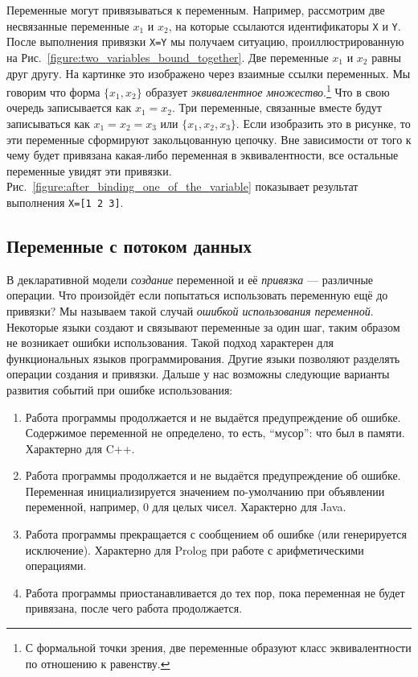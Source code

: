 Переменные могут привязываться к переменным. Например, рассмотрим две несвязанные переменные $x_{1}$ и $x_{2}$, на которые ссылаются идентификаторы \lstinline|X| и \lstinline|Y|. После выполнения привязки \lstinline|X=Y| мы получаем ситуацию, проиллюстрированную на Рис.~\ref{figure:two_variables_bound_together}. Две переменные $x_{1}$ и $x_{2}$ равны друг другу. На картинке это изображено через взаимные ссылки переменных. Мы говорим что форма $\{x_{1}, x_{2}\}$ образует \emph{эквивалентное множество}.\footnote{С формальной точки зрения, две переменные образуют класс эквивалентности по отношению к равенству.} Что в свою очередь записывается как $x_{1}=x_{2}$. Три переменные, связанные вместе будут записываться как $x_{1}=x_{2}=x_{3}$ или $\{x_{1}, x_{2}, x_{3}\}$. Если изобразить это в рисунке, то эти переменные сформируют закольцованную цепочку. Вне зависимости от того к чему будет привязана какая-либо переменная в эквивалентности, все остальные переменные увидят эти привязки. Рис.~\ref{figure:after_binding_one_of_the_variable} показывает результат выполнения \lstinline|X=[1 2 3]|.

\subsection{Переменные с потоком данных}\label{subsection:dataflow_variables}

В декларативной модели \emph{создание} переменной и её \emph{привязка} --- различные операции. Что произойдёт если попытаться использовать переменную ещё до привязки? Мы называем такой случай \emph{ошибкой использования переменной}. Некоторые языки создают и связывают переменные за один шаг, таким образом не возникает ошибки использования. Такой подход характерен для функциональных языков программирования. Другие языки позволяют разделять операции создания и привязки. Дальше у нас возможны следующие варианты развития событий при ошибке использования:

\begin{enumerate}
  
\item{Работа программы продолжается и не выдаётся предупреждение об ошибке. Содержимое переменной не определено, то есть, ``мусор'': что был в памяти. Характерно для C++.}

\item{Работа программы продолжается и не выдаётся предупреждение об ошибке. Переменная инициализируется значением по-умолчанию при объявлении переменной, например, 0 для целых чисел. Характерно для Java.}

\item{Работа программы прекращается с сообщением об ошибке (или генерируется исключение). Характерно для Prolog при работе с арифметическими операциями.}

\item{Работа программы приостанавливается до тех пор, пока переменная не будет привязана, после чего работа продолжается.}
\end{enumerate}

